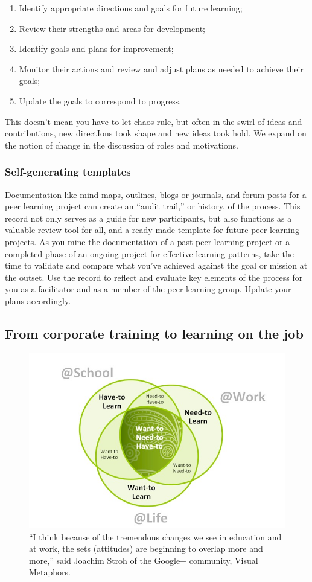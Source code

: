 \begin{enumerate}
\item
  Identify appropriate directions and goals for future learning;
\item
  Review their strengths and areas for development;
\item
  Identify goals and plans for improvement;
\item
  Monitor their actions and review and adjust plans as needed to achieve
  their goals;
\item
  Update the goals to correspond to progress.
\end{enumerate}
This doesn't mean you have to let chaos rule, but often in the swirl of
ideas and contributions, new directIons took shape and new ideas took
hold. We expand on the notion of change in the discussion of roles and
motivations.

\subsubsection{Self-generating templates}

Documentation like mind maps, outlines, blogs or journals, and forum
posts for a peer learning project can create an ``audit trail,'' or
history, of the process. This record not only serves as a guide for new
participants, but also functions as a valuable review tool for all, and
a ready-made template for future peer-learning projects. As you mine the
documentation of a past peer-learning project or a completed phase of an
ongoing project for effective learning patterns, take the time to
validate and compare what you've achieved against the goal or mission at
the outset. Use the record to reflect and evaluate key elements of the
process for you as a facilitator and as a member of the peer learning
group. Update your plans accordingly.

\subsection{From corporate training to learning on the job}

\begin{figure}
\begin{center}
\includegraphics[width=.75\textwidth]{../pictures/learn.jpg}
\caption*{``I think because of the
tremendous changes we see in education and at work, the sets
(attitudes) are beginning to overlap more and more,'' said Joachim
Stroh of the Google+ community, Visual Metaphors.}
\end{center}
\end{figure}

